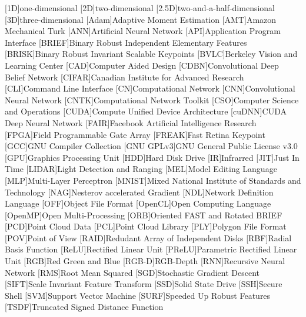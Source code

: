 \begin{acronym}
	[1D]{one-dimensional}
	[2D]{two-dimensional}
	[2.5D]{two-and-a-half-dimensional}
	[3D]{three-dimensional}
	[Adam]{Adaptive Moment Estimation}
	[AMT]{Amazon Mechanical Turk}
	[ANN]{Artificial Neural Network}
	[API]{Application Program Interface}
	[BRIEF]{Binary Robust Independent Elementary Features}
	[BRISK]{Binary Robust Invariant Scalable Keypoints}
	[BVLC]{Berkeley Vision and Learning Center}
	[CAD]{Computer Aided Design}
	[CDBN]{Convolutional Deep Belief Network}
	[CIFAR]{Canadian Institute for Advanced Research}
	[CLI]{Command Line Interface}
	[CN]{Computational Network}
	[CNN]{Convolutional Neural Network}
	[CNTK]{Computational Network Toolkit}
	[CSO]{Computer Science and Operations}
	[CUDA]{Compute Unified Device Architecture}
	[cuDNN]{CUDA Deep Neural Network}
	[FAIR]{Facebook Artificial Intelligence Research}
	[FPGA]{Field Programmable Gate Array}
	[FREAK]{Fast Retina Keypoint}
	[GCC]{GNU Compiler Collection}
	[GNU GPLv3]{GNU General Public License v3.0}
	[GPU]{Graphics Processing Unit}
	[HDD]{Hard Disk Drive}
	[IR]{Infrarred}
	[JIT]{Just In Time}
	[LIDAR]{Light Detection and Ranging}
	[MEL]{Model Editing Language}
	[MLP]{Multi-Layer Perceptron}
	[MNIST]{Mixed National Institute of Standards and Technology}
	[NAG]{Nesterov accelerated Gradient}
	[NDL]{Network Definition Language}
	[OFF]{Object File Format}
	[OpenCL]{Open Computing Language}
	[OpenMP]{Open Multi-Processing}
	[ORB]{Oriented FAST and Rotated BRIEF}
	[PCD]{Point Cloud Data}
  [PCL]{Point Cloud Library}
  [PLY]{Polygon File Format}
	[POV]{Point of View}
	[RAID]{Redudant Array of Independent Disks}
	[RBF]{Radial Basis Function}
	[ReLU]{Rectified Linear Unit}
	[PReLU]{Parametric Rectified Linear Unit}
	[RGB]{Red Green and Blue}
	[RGB-D]{RGB-Depth}
	[RNN]{Recursive Neural Network}
	[RMS]{Root Mean Squared}
	[SGD]{Stochastic Gradient Descent}
	[SIFT]{Scale Invariant Feature Transform}
	[SSD]{Solid State Drive}
	[SSH]{Secure Shell}
	[SVM]{Support Vector Machine}
	[SURF]{Speeded Up Robust Features}
	[TSDF]{Truncated Signed Distance Function}
\end{acronym}
